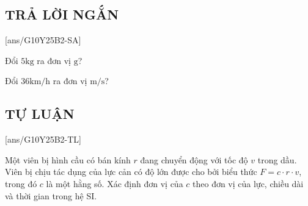 
\subsection{TRẢ LỜI NGẮN}
\setcounter{ex}{0}
[ans/G10Y25B2-SA]
\begin{ex}
	Đổi $5 \si{\kilo\gram}$ ra đơn vị $\si{\gram}$?
\end{ex}

\begin{ex}
	Đổi $36 \si{\kilo\meter/\hour}$ ra đơn vị $\si{\meter/\second}$?
\end{ex}


\subsection{TỰ LUẬN}
\setcounter{ex}{0}
[ans/G10Y25B2-TL]
\begin{ex}
	Một viên bị hình cầu có bán kính $r$ đang chuyển động với tốc độ $v$ trong dầu. Viên bị chịu tác dụng của lực cản có độ lớn được cho bởi biểu thức $F=c\cdot r\cdot v$, trong đó $c$ là một hằng số. Xác định đơn vị của $c$ theo đơn vị của lực, chiều dài và thời gian trong hệ SI.
\end{ex}

